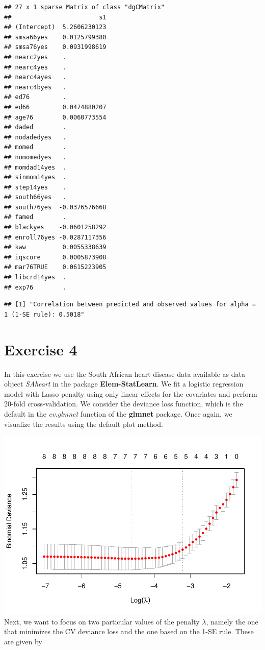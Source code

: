 \documentclass[
]{article}
\begin{document}
\begin{verbatim}
## 27 x 1 sparse Matrix of class "dgCMatrix"
##                        s1
## (Intercept)  5.2606230123
## smsa66yes    0.0125799380
## smsa76yes    0.0931998619
## nearc2yes    .           
## nearc4yes    .           
## nearc4ayes   .           
## nearc4byes   .           
## ed76         .           
## ed66         0.0474880207
## age76        0.0060773554
## daded        .           
## nodadedyes   .           
## momed        .           
## nomomedyes   .           
## momdad14yes  .           
## sinmom14yes  .           
## step14yes    .           
## south66yes   .           
## south76yes  -0.0376576668
## famed        .           
## blackyes    -0.0601258292
## enroll76yes -0.0287117356
## kww          0.0055338639
## iqscore      0.0005873908
## mar76TRUE    0.0615223905
## libcrd14yes  .           
## exp76        .
\end{verbatim}

\begin{verbatim}
## [1] "Correlation between predicted and observed values for alpha = 1 (1-SE rule): 0.5018"
\end{verbatim}

\hypertarget{exercise-4}{%
\section{Exercise 4}\label{exercise-4}}

In this exercise we use the South African heart disease data available
as data object \textit{SAheart} in the package \textbf{Elem-StatLearn}.
We fit a logistic regression model with Lasso penalty using only linear
effects for the covariates and perform 20-fold cross-validation. We
consider the deviance loss function, which is the default in the
\textit{cv.glmnet} function of the \textbf{glmnet} package. Once again,
we visualize the results using the default plot method.

\includegraphics{A2_files/figure-latex/unnamed-chunk-11-1.pdf} Next, we
want to focus on two particular values of the penalty \(\lambda\),
namely the one that minimizes the CV deviance loss and the one based on
the 1-SE rule. These are given by
\end{document}
